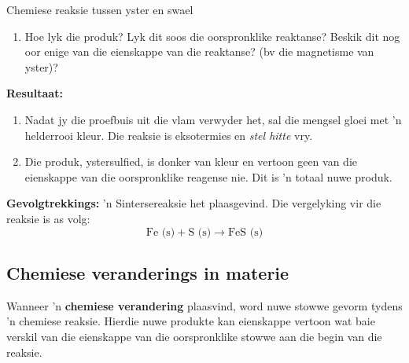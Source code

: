 \begin{g_experiment}{Chemiese reaksie tussen yster en swael}
\begin{enumerate}[noitemsep, label=\textbf{\arabic*}. ]
\label{m38709*uid24}\item Hoe lyk die produk? Lyk dit soos die oorspronklike reaktanse? Beskik dit nog oor enige van die eienskappe van
die reaktanse? (bv die magnetisme van yster)?
\end{enumerate}
        \par 
        \label{m38709*eip-963}
	\par
      \label{m38709*id63554}\noindent{}\textbf{Resultaat:}
          \newline
        \label{m38709*id63560}\begin{enumerate}[noitemsep, label=\textbf{\arabic*}. ] 
            \label{m38709*uid25}\item Nadat jy die proefbuis uit die vlam verwyder het, sal die mengsel gloei met 'n helderrooi kleur. Die reaksie is
eksotermies en \textsl{stel hitte} vry.
\label{m38709*uid26}\item Die produk, ystersulfied, is donker van kleur en vertoon geen van die eienskappe van die oorspronklike reagense nie. Dit is 'n totaal nuwe produk.
\end{enumerate}
        \par 
        \label{m38709*id63594}\noindent{}\textbf{Gevolgtrekkings:}
          \newline
 'n Sintersereaksie het plaasgevind. Die vergelyking vir die reaksie is as volg:
        \label{m38709*id63604}\nopagebreak\noindent{}
    \begin{equation*}
    \text{Fe (s)}+\text{S (s)}\to \text{FeS (s)}
      \end{equation*} 
\end{g_experiment}
    \label{m38709*cid3}
            \subsection*{Chemiese veranderings in materie}
            \nopagebreak
      \label{m38709*id62778}Wanneer 'n \textbf{chemiese verandering} plaasvind, word nuwe stowwe gevorm tydens 'n chemiese reaksie. Hierdie nuwe produkte kan eienskappe vertoon wat baie verskil van die eienskappe van die oorspronklike stowwe aan die begin van die reaksie.\par 
            

